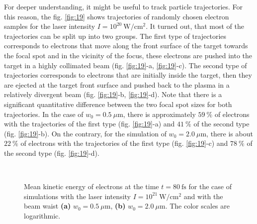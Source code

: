 For deeper understanding, it might be useful to track particle trajectories. For this reason, the fig. \ref{fig:19} shows trajectories of randomly chosen electron samples for the laser intensity $ I = 10^{20} \ \mathrm{W/cm^2} $. It turned out, that most of the trajectories can be split up into two groups. The first type of trajectories corresponds to electrons that move along the front surface of the target towards the focal spot and in the vicinity of the focus, these electrons are pushed into the target in a highly collimated beam (fig. \ref{fig:19}-a, \ref{fig:19}-c). The second type of trajectories corresponds to electrons that are initially inside the target, then they are ejected at the target front surface and pushed back to the plasma in a relatively divergent beam (fig. \ref{fig:19}-b, \ref{fig:19}-d). Note that there is a significant quantitative difference between the two focal spot sizes for both trajectories. In the case of $ w_0 = 0.5 \ \mu\mathrm{m} $, there is approximately $ 59 \ \% $ of electrons with the trajectories of the first type (fig. \ref{fig:19}-a) and $ 41 \ \% $ of the second type (fig. \ref{fig:19}-b). On the contrary, for the simulation of $ w_0 = 2.0 \ \mu\mathrm{m} $, there is about $ 22 \ \% $ of electrons with the trajectories of the first type (fig. \ref{fig:19}-c) and $ 78 \ \% $ of the second type (fig. \ref{fig:19}-d).

\begin{figure}[h!]
	\centering
	\\[2mm]
	\caption{Mean kinetic energy of electrons at the time $ t = 80 \ \mathrm{fs} $ for the case of simulations with the laser intensity $ I = 10^{21} \ \mathrm{W/cm^2} $ and with the beam waist \textbf{(a)} $ w_0 = 0.5 \ \mu\mathrm{m} $, \textbf{(b)} $ w_0 = 2.0 \ \mu\mathrm{m} $. The color scales are logarithmic.}
	\label{fig:17}
\end{figure}

